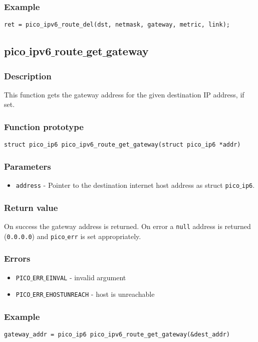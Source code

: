 \subsubsection*{Example}
\begin{verbatim}
ret = pico_ipv6_route_del(dst, netmask, gateway, metric, link);
\end{verbatim}



\subsection{pico$\_$ipv6$\_$route$\_$get$\_$gateway}

\subsubsection*{Description}
This function gets the gateway address for the given destination IP address, if set.

\subsubsection*{Function prototype}
\begin{verbatim}
struct pico_ip6 pico_ipv6_route_get_gateway(struct pico_ip6 *addr)
\end{verbatim}

\subsubsection*{Parameters}
\begin{itemize}[noitemsep]
\item \texttt{address} - Pointer to the destination internet host address as struct \texttt{pico$\_$ip6}.
\end{itemize}

\subsubsection*{Return value}
On success the gateway address is returned.
On error a \texttt{null} address is returned (\texttt{0.0.0.0}) and \texttt{pico$\_$err} is set appropriately.

\subsubsection*{Errors}
\begin{itemize}[noitemsep]
\item \texttt{PICO$\_$ERR$\_$EINVAL} - invalid argument
\item \texttt{PICO$\_$ERR$\_$EHOSTUNREACH} - host is unreachable
\end{itemize}

\subsubsection*{Example}
\begin{verbatim}
gateway_addr = pico_ip6 pico_ipv6_route_get_gateway(&dest_addr)
\end{verbatim}

